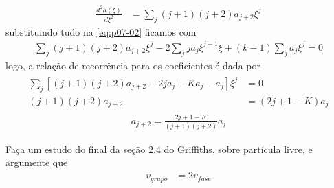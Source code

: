 \begin{prob}
\begin{sol}
\begin{enumerate}[label=\alph *)]
				\begin{align}
					\frac{d^{2}h(\xi)}{d \xi^{2}} &= \sum_{j}(j+1)(j+2)a_{j+2} \xi^{j}
				\end{align}
				substituindo tudo na \eqref{eq:p07-02} ficamos com
				\begin{align}
					\sum_{j}(j+1)(j+2)a_{j+2} \xi^{j}-2\sum_{j}ja_{j} \xi^{j-1} \xi+(k-1)\sum_{j}a_{j}\xi^{j}=0
				\end{align}
				logo, a relação de recorrência para os coeficientes é dada por
				\begin{align}
						\begin{split}
							\sum_{j}\left[(j+1)(j+2)a_{j+2}-2ja_{j}+Ka_{j}-a_{j}\right] \xi^{j} &= 0\\
							(j+1)(j+2)a_{j+2} &= \left(2j+1-K\right)a_{j} 
						\end{split}
				\end{align}
				\begin{align}
						\boxed{
							a_{j+2} = \frac{2j+1-K}{(j+1)(j+2)}a_{j}
						}
				\end{align}


		\end{enumerate}

	\end{sol}
\end{prob}
\begin{prob}
	Faça um estudo do final  da seção  2.4 do Griffiths, sobre partícula livre, e argumente  que
	\begin{align}
		v_{grupo}	&= 2v_{fase}
	\end{align}
\end{prob}
